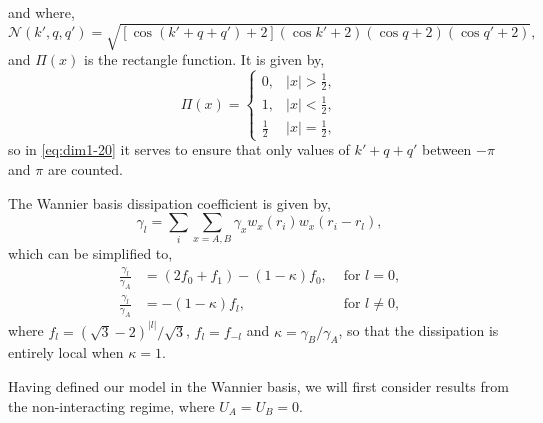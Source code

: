 and where,
\begin{equation}
	\mathcal{N}(k',q,q') = \sqrt{\left[ \cos(k'+q+q') + 2\right](\cos k'+2)(\cos q+2)(\cos q'+2)},
	\label{eq:dim1-20}
\end{equation}
and \(\Pi(x)\) is the rectangle function. It is given by,
\begin{equation}
	\Pi(x) = \begin{cases}
	0, & |x| > \frac{1}{2}, \\
	1, & |x| < \frac{1}{2}, \\
	\frac{1}{2} & |x| = \frac{1}{2},
	\end{cases}
	\label{eq:dim1-24}
\end{equation}
so in \cref{eq:dim1-20} it serves to ensure that only values of \( k' + q + q' \) between \(-\pi\) and \(\pi\) are counted. 

The Wannier basis dissipation coefficient is given by,
\begin{equation}
	\gamma_{l} = \sum_{i} \sum_{x=A,B} \gamma_{x}w_{x}(r_{i})w_{x}(r_{i} - r_{l}),
	\label{eq:dim1-21}
\end{equation}
which can be simplified to,
\begin{align}
	\frac{\gamma_{l}}{\gamma_{A}} &= (2f_{0} + f_{1}) - (1 - \kappa)f_{0}, &\text{ for }l=0, \label{eq:dim1-22} \\
	\frac{\gamma_{l}}{\gamma_{A}} &= -(1-\kappa)f_{l}, &\text{ for }l \neq 0, \label{eq:dim1-23}
\end{align}
where \(f_{l} = (\sqrt{3}-2)^{|l|}/\sqrt{3}\), \(f_{l}=f_{-l}\) and \(\kappa = \gamma_{B}/\gamma_{A}\), so that the dissipation is entirely local when \(\kappa = 1\). 

Having defined our model in the Wannier basis, we will first consider results from the non-interacting regime, where \(U_{A} = U_{B} = 0\).

